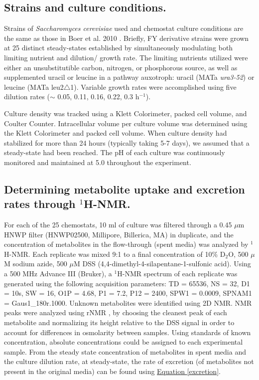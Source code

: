 \subsection*{Strains and culture conditions.} 

Strains of \textit{Saccharomyces cerevisiae} used and chemostat culture conditions are the same as those in Boer et al. 2010 \cite{Boer:2010fb}.  Briefly, FY derivative strains were grown at 25 distinct steady-states established by simultaneously modulating both limiting nutrient and dilution/ growth rate. The limiting nutrients utilized were either an unsubstitutible carbon, nitrogen, or phosphorous source, as well as supplemented uracil or leucine in a pathway auxotroph: uracil (MATa \textit{ura3-52}) or leucine (MATa leu2$\bigtriangleup$1).  Variable growth rates were accomplished using five dilution rates ($\sim$ 0.05, 0.11, 0.16, 0.22, 0.3 h$^{-1}$).

Culture density was tracked using a Klett Colorimeter, packed cell volume, and Coulter Counter. Intracellular volume per culture volume was determined using the Klett Colorimeter and packed cell volume.  When culture density had stabilized for more than 24 hours (typically taking 5-7 days), we assumed that a steady-state had been reached.  The pH of each culture was continuously monitored and maintained at 5.0 throughout the experiment.

\subsection*{Determining metabolite uptake and excretion rates through $^{1}$H-NMR.}

For each of the 25 chemostats, 10 ml of culture was filtered through a 0.45 $\mu$m HNWP filter (HNWP02500, Millipore, Billerica, MA) in duplicate, and the concentration of metabolites in the flow-through (spent media) was analyzed by $^{1}$H-NMR.  Each replicate was mixed 9:1 to a final concentration of 10\% D$_{2}$O, 500 $\mu$M sodium azide, 500 $\mu$M DSS (4,4-dimethyl-4-silapentane-1-sulfonic acid).  Using a 500 MHz Advance III (Bruker), a $^{1}$H-NMR spectrum of each replicate was generated using the following acquisition parameters: TD = 65536, NS = 32, D1 = 10s, SW = 16, O1P = 4.68, P1 = 7.2, P12 = 2400, SPW1 = 0.0009, SPNAM1 = Gaus1\_180r.1000.  Unknown metabolites were identified using 2D NMR.  NMR peaks were analyzed using rNMR \cite{Lewis:2009bx}, by choosing the cleanest peak of each metabolite and normalizing its height relative to the DSS signal in order to account for differences in osmolarity between samples.  Using standards of known concentration, absolute concentrations could be assigned to each experimental sample.  From the steady state concentration of metabolites in spent media and the culture dilution rate, at steady-state, the rate of excretion (of metabolites not present in the original media) can be found using \hyperref[excretion]{Equation \ref{excretion}}.  

